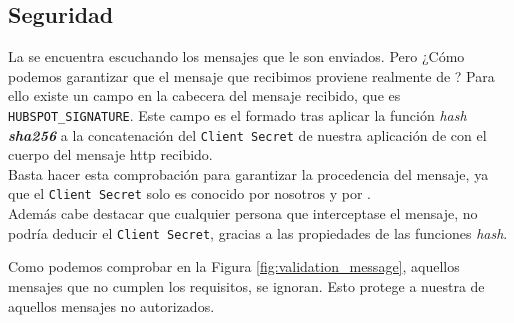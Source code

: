 \begin{itemize}[leftmargin=*]
\end{itemize}




\subsection{Seguridad}
\label{subsec:security}

La \iface{} se encuentra escuchando los mensajes que le son enviados. Pero ¿Cómo podemos garantizar que el mensaje que recibimos proviene realmente de \hs{}?
Para ello existe un campo en la cabecera del mensaje recibido, que es \texttt{HUBSPOT\_SIGNATURE}. 
Este campo es el formado tras aplicar la función \textit{hash \textbf{sha256}} a la concatenación del \texttt{Client Secret} de nuestra aplicación de \hs{} con el cuerpo del mensaje \acrshort{http} recibido.\\

Basta hacer esta comprobación para garantizar la procedencia del mensaje, ya que el \texttt{Client Secret} solo es conocido por nosotros y por \hs{}. \\

Además cabe destacar que cualquier persona que interceptase el mensaje, no podría deducir el \texttt{Client Secret}, gracias a las propiedades de las funciones \textit{hash}. 




Como podemos comprobar en la Figura \ref{fig:validation_message}, aquellos mensajes que no cumplen los requisitos, se ignoran. Esto protege a nuestra \iface{} de aquellos mensajes no autorizados.

